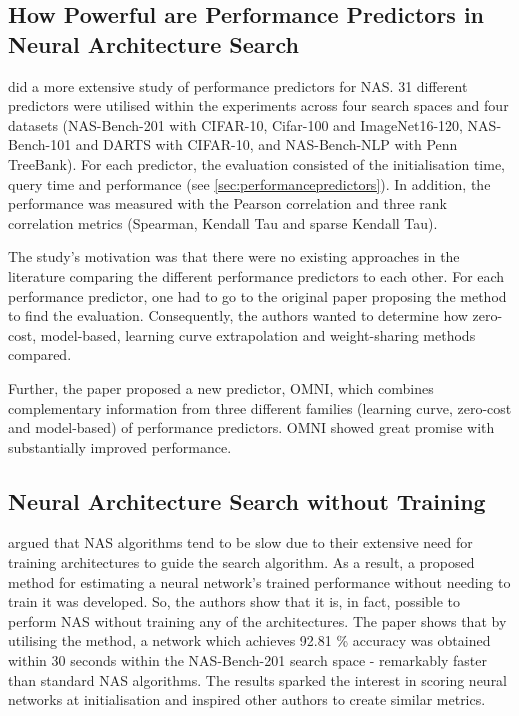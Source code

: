 \subsection{How Powerful are Performance Predictors in Neural Architecture Search}

\cite{white2021powerful} did a more extensive study of performance predictors for \gls{NAS}. 31 different predictors were utilised within the experiments across four search spaces and four datasets (NAS-Bench-201 with CIFAR-10, Cifar-100 and ImageNet16-120, NAS-Bench-101 and DARTS with CIFAR-10, and NAS-Bench-NLP with Penn TreeBank). For each predictor, the evaluation consisted of the initialisation time, query time and performance (see \cref{sec:performancepredictors}). In addition, the performance was measured with the Pearson correlation and three rank correlation metrics (Spearman, Kendall Tau and sparse Kendall Tau). 

The study's motivation was that there were no existing approaches in the literature comparing the different performance predictors to each other. For each performance predictor, one had to go to the original paper proposing the method to find the evaluation. Consequently, the authors wanted to determine how zero-cost, model-based, learning curve extrapolation and weight-sharing methods compared. 

Further, the paper proposed a new predictor, OMNI, which combines complementary information from three different families (learning curve, zero-cost and model-based) of performance predictors. OMNI showed great promise with substantially improved performance. 

\subsection{Neural Architecture Search without Training}
\autocite{jacob_conv} argued that \gls{NAS} algorithms tend to be slow due to their extensive need for training architectures to guide the search algorithm. As a result, a proposed method for estimating a neural network's trained performance without needing to train it was developed. So, the authors show that it is, in fact, possible to perform \gls{NAS} without training any of the architectures. The paper shows that by utilising the method, a network which achieves 92.81 \% accuracy was obtained within 30 seconds within the NAS-Bench-201 search space - remarkably faster than standard \gls{NAS} algorithms. The results sparked the interest in scoring neural networks at initialisation and inspired other authors to create similar metrics. 


